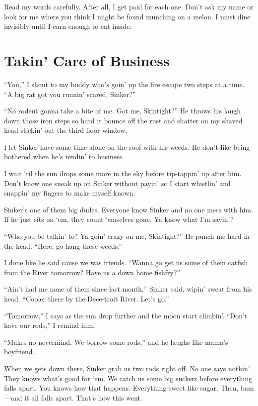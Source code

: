 \documentclass[twoside,10pt]{book}
\begin{document}
Read my words carefully. After all, I get paid for each one. Don't ask
my name or look for me where you think I might be found munching on a
melon. I must dine invisibly until I earn enough to eat inside.



\cleardoublepage
\chapter{Takin' Care of Business}

``You,'' I shout to my buddy who's goin' up the fire escape two steps at
a time. ``A big rat got you runnin' scared, Sinker?''

``No rodent gonna take a bite of me. Got me, Skintight?'' He throws his
laugh down those iron steps so hard it bounce off the rust and shatter
on my shaved head stickin' out the third floor window.

I let Sinker have some time alone on the roof with his weeds. He don't
like being bothered when he's tendin' to business.

I wait `til the sun drops some more in the sky before tip-tappin' up
after him. Don't know one sneak up on Sinker without payin' so I start
whistlin' and snappin' my fingers to make myself known.

Sinker's one of them big dudes. Everyone know Sinker and no one mess
with him. If he just sits on `em, they count `emselves gone. Ya know
what I'm sayin'?

``Who you be talkin' to? Ya goin' crazy on me, Skintight?'' He punch me
hard in the head. ``Here, go hang these weeds.''

I done like he said cause we was friends. ``Wanna go get us some of them
catfish from the River tomorrow? Have us a down home fishfry?''

``Ain't had me none of them since last month,'' Sinker said, wipin'
sweat from his head. ``Cooler there by the Deee-troit River. Let's go.''

``Tomorrow,'' I says as the sun drop further and the moon start
climbin'. ``Don't have our rods,'' I remind him.

``Makes no nevermind. We borrow some rods,'' and he laughs like mama's
boyfriend.

When we gets down there, Sinker grab us two rods right off. No one says
nothin'. They knows what's good for `em. We catch us some big suckers
before everything falls apart. You knows how that happens. Everything
sweet like sugar. Then, bam---and it all falls apart. That's how this
went.
\end{document}
